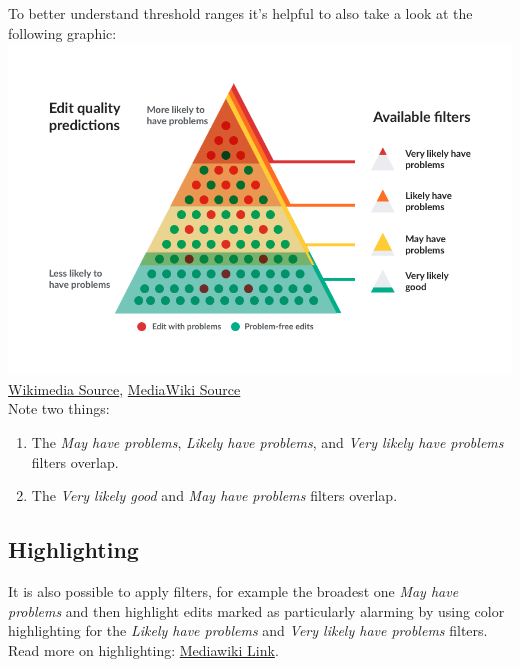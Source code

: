\documentclass[12pt,a4paper]{article}
\begin{document}
{To better understand threshold ranges it's helpful to also take a look at the following graphic:\\
\includegraphics[scale=0.5]{resources/6/RC-quality-filters-diagram}\\
\href{https://upload.wikimedia.org/wikipedia/commons/e/e8/RC-quality-filters-diagram.png}{Wikimedia Source}, \href{https://www.mediawiki.org/wiki/Help:New_filters_for_edit_review/Quality_and_Intent_Filters}{MediaWiki Source}\\
Note two things:
\begin{enumerate}
\item The \textit{May have problems}, \textit{Likely have problems}, and \textit{Very likely have problems} filters overlap.
\item The \textit{Very likely good} and \textit{May have problems} filters overlap.
\end{enumerate}
\subsection{Highlighting}
It is also possible to apply filters, for example the broadest one \textit{May have problems} and then highlight edits marked as particularly alarming by using color highlighting for the \textit{Likely have problems} and \textit{Very likely have problems} filters.\\
Read more on highlighting: \href{https://www.mediawiki.org/wiki/Help:New_filters_for_edit_review/Highlighting_function}{Mediawiki Link}.
}
\end{document}
